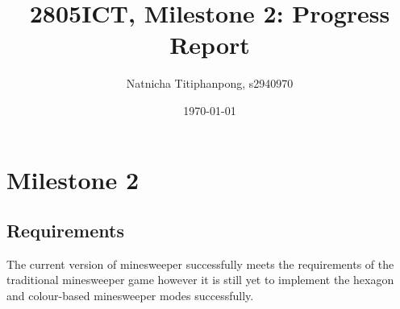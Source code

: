 \documentclass[12pt, a4]{report}
\title{2805ICT, Milestone 2: Progress Report}
\author{Natnicha Titiphanpong, s2940970}%
\date{\today}
\begin{document}
	
	\begin{titlepage}
		\maketitle
	\end{titlepage}
	\tableofcontents
	\pagebreak
	\section{Milestone 2}
	\subsection{Requirements}
	\par The current  version of minesweeper successfully meets the requirements of the traditional minesweeper game however it is still yet to implement the hexagon and colour-based minesweeper  modes successfully. 
\end{document}
